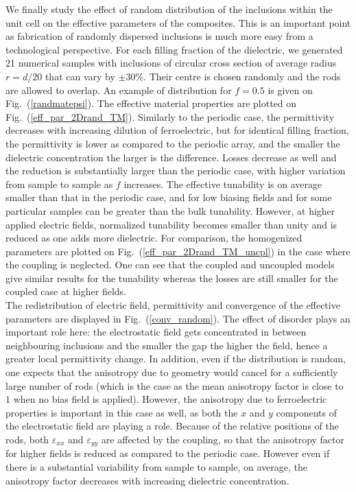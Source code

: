 \documentclass[%
 aip,
 amsmath,amssymb,
 reprint,%
linenumbers
]{revtex4-1}
\newcommand{\fig}[1]{Fig.~(\ref{#1})}
\begin{document}
We finally study the effect of random distribution of the inclusions within the unit cell on the effective parameters of the
composites. This is an important point as fabrication of randomly dispersed
inclusions is much more easy from a technological perspective. For each filling fraction of the dielectric,
we generated 21 numerical samples with inclusions of circular cross section of average radius
$r=d/20$ that can vary by $\pm 30\%$. Their centre is chosen randomly and the
rods are allowed to overlap. An example of distribution for $f=0.5$ is given on \fig{randmatepsi}.
The effective material properties are plotted on \fig{eff_par_2Drand_TM}.
Similarly to the periodic case, the permittivity decreases with increasing dilution of
ferroelectric, but for identical filling fraction,
the permittivity is lower as compared to the periodic array, and the smaller the dielectric concentration the larger
is the difference. Losses decrease as well and the reduction is substantially larger
than the periodic case, with higher variation from sample to sample as $f$ increases.
The effective tunability is on average smaller than that in the periodic case, and
for low biasing fields and for some particular samples can be greater than the bulk tunability. However,
at higher applied electric fields, normalized tunability becomes smaller than unity and
is reduced as one adds more dielectric. For comparison, the homogenized
parameters are plotted on \fig{eff_par_2Drand_TM_uncpl} in the case where the coupling is
neglected. One can see that the coupled and uncoupled models give
similar results for the tunability whereas the losses are still smaller for the coupled case
at higher fields.\\
The redistribution of electric field, permittivity and convergence of
the effective parameters are displayed in \fig{conv_random}. The effect of
disorder plays an important role here: the electrostatic field gets concentrated
in between neighbouring inclusions and the smaller the gap the higher the field, hence
a greater local permittivity change. In addition, even if the distribution is
random, one expects that the anisotropy due to geometry would cancel for a sufficiently large number
of rods (which is the case as the mean anisotropy factor is close to $1$ when no
bias field is applied). However, the anisotropy due to ferroelectric properties is
important in this case as well, as both the $x$ and $y$ components of the electrostatic field
are playing a role.
Because of the relative positions of the rods, both $\varepsilon_{xx}$ and $\varepsilon_{yy}$ are affected
by the coupling, so that the anisotropy factor for higher fields is reduced as compared to the periodic case.
However even if there is a substantial variability from sample to sample, on average, the anisotropy factor
decreases with increasing dielectric concentration.
\end{document}
